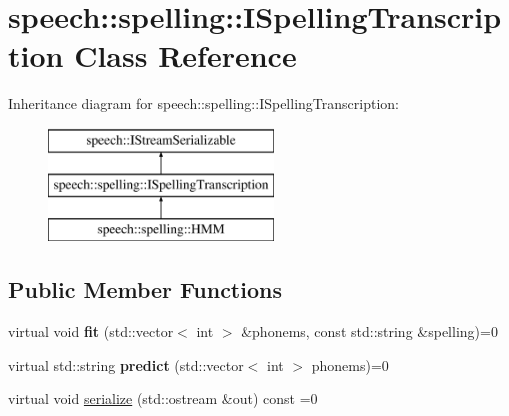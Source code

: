 \hypertarget{classspeech_1_1spelling_1_1ISpellingTranscription}{\section{speech\+:\+:spelling\+:\+:I\+Spelling\+Transcription Class Reference}
\label{classspeech_1_1spelling_1_1ISpellingTranscription}
}
Inheritance diagram for speech\+:\+:spelling\+:\+:I\+Spelling\+Transcription\+:\begin{figure}[H]
\begin{center}
\leavevmode
\includegraphics[height=3.000000cm]{classspeech_1_1spelling_1_1ISpellingTranscription}
\end{center}
\end{figure}
\subsection*{Public Member Functions}
\begin{DoxyCompactItemize}
\item 
\hypertarget{classspeech_1_1spelling_1_1ISpellingTranscription_a50dc83bbb65ffb0e37ba6915fbfb43ec}{virtual void {\bfseries fit} (std\+::vector$<$ int $>$ \&phonems, const std\+::string \&spelling)=0}\label{classspeech_1_1spelling_1_1ISpellingTranscription_a50dc83bbb65ffb0e37ba6915fbfb43ec}

\item 
\hypertarget{classspeech_1_1spelling_1_1ISpellingTranscription_a3b3f279e616c29ab102af2b720574e82}{virtual std\+::string {\bfseries predict} (std\+::vector$<$ int $>$ phonems)=0}\label{classspeech_1_1spelling_1_1ISpellingTranscription_a3b3f279e616c29ab102af2b720574e82}

\item 
virtual void \hyperlink{classspeech_1_1spelling_1_1ISpellingTranscription_a2ebd3da352eac002869c2f29ad890b16}{serialize} (std\+::ostream \&out) const =0
\end{DoxyCompactItemize}



